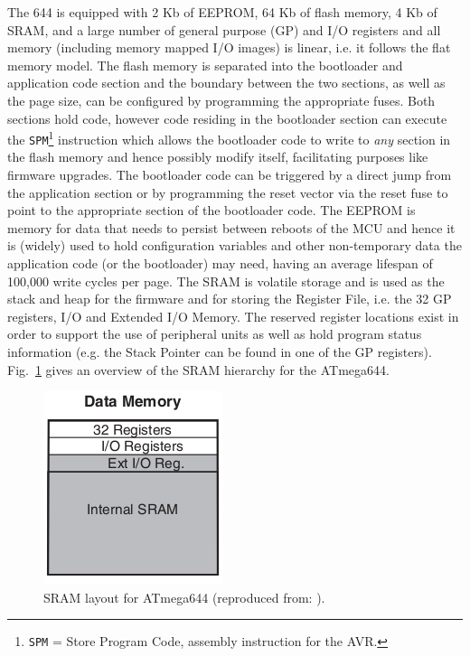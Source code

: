 	The 644 is equipped with 2 Kb of EEPROM, 64 Kb of flash memory, 4 Kb of SRAM, and a large number of general purpose (GP) and I/O registers and all memory (including memory mapped I/O images) is linear, i.e. it follows the flat memory model. The flash memory is separated into the bootloader and application code section and the boundary between the two sections, as well as the page size, can be configured by programming the appropriate fuses. Both sections hold code, however code residing in the bootloader section can execute the \texttt{SPM}\footnote{\texttt{SPM} = Store Program Code, assembly instruction for the AVR.} instruction which allows the bootloader code to write to \textit{any} section in the flash memory and hence possibly modify itself, facilitating purposes like firmware upgrades. The bootloader code can be triggered by a direct jump from the application section or by programming the reset vector via the reset fuse to point to the appropriate section of the bootloader code. The EEPROM is memory for data that needs to persist between reboots of the MCU and hence it is (widely) used to hold configuration variables and other non-temporary data the application code (or the bootloader) may need, having an average lifespan of 100,000 write cycles per page. The SRAM is volatile storage and is used as the stack and heap for the firmware and for storing the Register File, i.e. the 32 GP registers, I/O and Extended I/O Memory. The reserved register locations exist in order to support the use of peripheral units as well as hold program status information (e.g. the Stack Pointer can be found in one of the GP registers). Fig.~\ref{fig:stack} gives an overview of the SRAM hierarchy for the ATmega644.
	
	\begin{figure}
		\center
		\includegraphics[scale=0.7]{img/stack.png}
		\caption{\footnotesize SRAM layout for ATmega644 (reproduced from: \protect\citep{atmega_manual}).}
		\label{fig:stack}		
	\end{figure}

